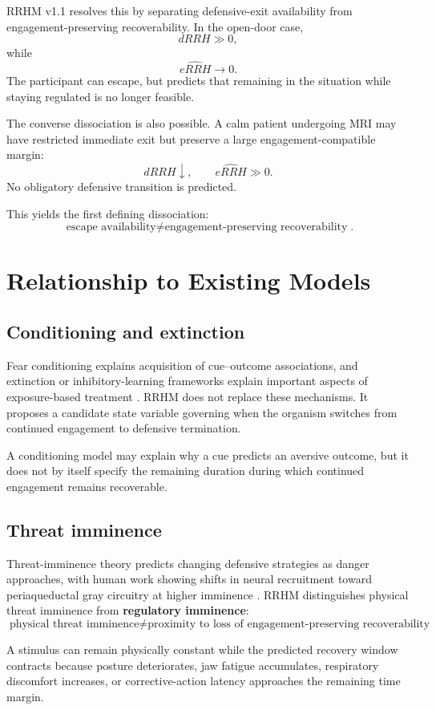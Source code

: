 \documentclass[9pt,twocolumn]{article}
\begin{document}
RRHM v1.1 resolves this by separating defensive-exit availability from engagement-preserving recoverability. In the open-door case,
\[
dRRH\gg0,
\]
while
\[
\widehat{eRRH}\rightarrow0.
\]
The participant can escape, but predicts that remaining in the situation while staying regulated is no longer feasible.

The converse dissociation is also possible. A calm patient undergoing MRI may have restricted immediate exit but preserve a large engagement-compatible margin:
\[
dRRH\downarrow,\qquad \widehat{eRRH}\gg0.
\]
No obligatory defensive transition is predicted.

This yields the first defining dissociation:
\[
\boxed{\text{escape availability}\neq\text{engagement-preserving recoverability}}.
\]

\section{Relationship to Existing Models}
\subsection{Conditioning and extinction}
Fear conditioning explains acquisition of cue--outcome associations, and extinction or inhibitory-learning frameworks explain important aspects of exposure-based treatment \cite{kausche2025,krypotos2015,pittig2018}. RRHM does not replace these mechanisms. It proposes a candidate state variable governing when the organism switches from continued engagement to defensive termination.

A conditioning model may explain why a cue predicts an aversive outcome, but it does not by itself specify the remaining duration during which continued engagement remains recoverable.

\subsection{Threat imminence}
Threat-imminence theory predicts changing defensive strategies as danger approaches, with human work showing shifts in neural recruitment toward periaqueductal gray circuitry at higher imminence \cite{mobbs2007}. RRHM distinguishes physical threat imminence from \textbf{regulatory imminence}:
\[
\boxed{\text{physical threat imminence}\neq\text{proximity to loss of engagement-preserving recoverability}}.
\]

A stimulus can remain physically constant while the predicted recovery window contracts because posture deteriorates, jaw fatigue accumulates, respiratory discomfort increases, or corrective-action latency approaches the remaining time margin.
\end{document}
